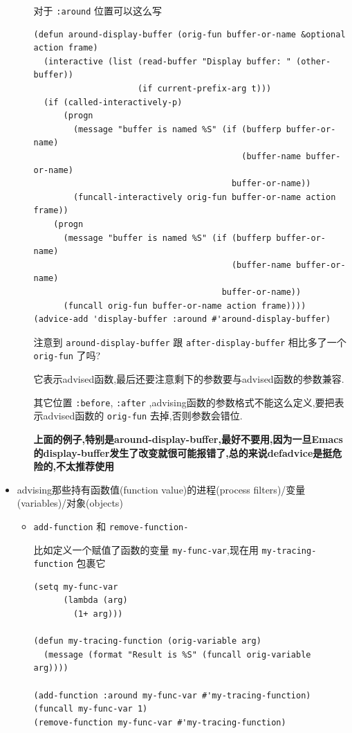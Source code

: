 \documentclass[11pt]{article}
\begin{document}
\begin{itemize}
\begin{itemize}
对于 \texttt{:around} 位置可以这么写

\begin{verbatim}
(defun around-display-buffer (orig-fun buffer-or-name &optional action frame)
  (interactive (list (read-buffer "Display buffer: " (other-buffer))
                     (if current-prefix-arg t)))
  (if (called-interactively-p)
      (progn
        (message "buffer is named %S" (if (bufferp buffer-or-name)
                                          (buffer-name buffer-or-name)
                                        buffer-or-name))
        (funcall-interactively orig-fun buffer-or-name action frame))
    (progn
      (message "buffer is named %S" (if (bufferp buffer-or-name)
                                        (buffer-name buffer-or-name)
                                      buffer-or-name))
      (funcall orig-fun buffer-or-name action frame))))
(advice-add 'display-buffer :around #'around-display-buffer)
\end{verbatim}

注意到 \texttt{around-display-buffer} 跟 \texttt{after-display-buffer} 相比多了一个 \texttt{orig-fun} 了吗?

它表示advised函数,最后还要注意剩下的参数要与advised函数的参数兼容.

其它位置 \texttt{:before}, \texttt{:after} ,advising函数的参数格式不能这么定义,要把表示advised函数的 \texttt{orig-fun} 去掉,否则参数会错位.

\textbf{上面的例子,特别是around-display-buffer,最好不要用,因为一旦Emacs的display-buffer发生了改变就很可能报错了,总的来说defadvice是挺危险的,不太推荐使用}
\end{itemize}

\item advising那些持有函数值(function value)的进程(process filters)/变量(variables)/对象(objects)

\begin{itemize}
\item \texttt{add-function} 和 \texttt{remove-function-}

比如定义一个赋值了函数的变量 \texttt{my-func-var},现在用 \texttt{my-tracing-function} 包裹它

\begin{verbatim}
(setq my-func-var
      (lambda (arg)
        (1+ arg)))

(defun my-tracing-function (orig-variable arg)
  (message (format "Result is %S" (funcall orig-variable arg))))

(add-function :around my-func-var #'my-tracing-function)
(funcall my-func-var 1)
(remove-function my-func-var #'my-tracing-function)
\end{verbatim}


\end{itemize}
\end{itemize}
\end{document}
